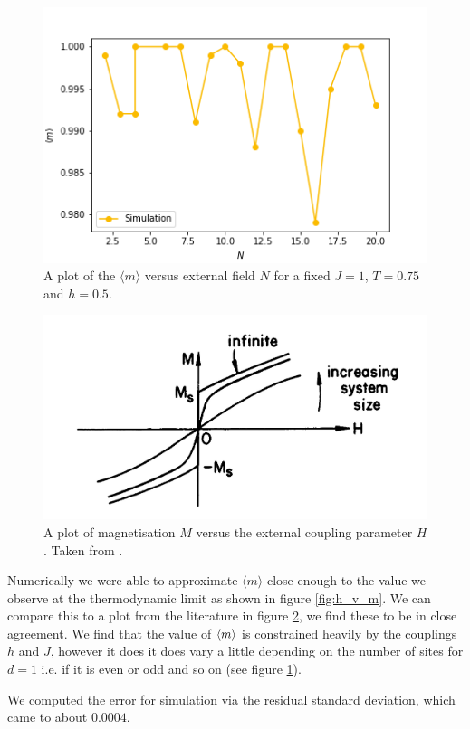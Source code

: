 \documentclass{cernatsnote}
\begin{document}
\begin{figure}[H]
    \centering
    \includegraphics[scale =0.7]{images/m_v_n.png}
    \caption{A plot of the $\langle m \rangle$ versus external field $N$ for a fixed $J = 1$, $T = 0.75$ and $h = 0.5$.}
    \label{fig:N_v_m}
\end{figure}
\begin{figure}[H]
    \centering
    \includegraphics[scale=0.15]{images/mag.jpeg}
    \caption{A plot of magnetisation $M$ versus the external coupling parameter $H$. Taken from \cite{goldenfeld}.}
    \label{fig:m_golden}
\end{figure}
Numerically we were able to approximate $\langle m \rangle$ close enough to the value we observe at the thermodynamic limit as shown in figure \ref{fig:h_v_m}. We can compare this to a plot from the literature in figure \ref{fig:m_golden}, we find these to be in close agreement. We find that the value of $\expval{m}$ is constrained heavily by the couplings $h$ and $J$, however it does it does vary a little depending on the number of sites for $d=1$ i.e. if it is even or odd and so on (see figure \ref{fig:N_v_m}).

We computed the error for simulation via the residual standard deviation, which came to about $0.0004$. 


\end{document}
